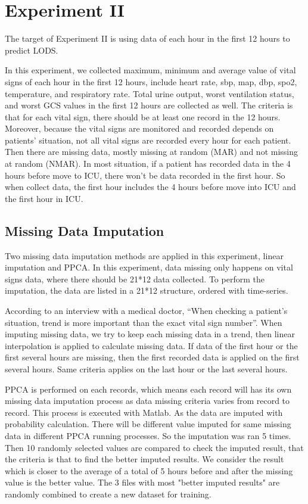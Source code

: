 \documentclass[12pt,a4paper,english
]{tunithesis}
\begin{document}
\section{Experiment II}

The target of Experiment II is using data of each hour in the first 12 hours to predict LODS.

In this experiment, we collected maximum, minimum and average value of vital signs of each hour in the first 12 hours, include heart rate, sbp, map, dbp, spo2, temperature, and respiratory rate. Total urine output, worst ventilation status, and worst GCS values in the first 12 hours are collected as well. The criteria is that for each vital sign, there should be at least one record in the 12 hours. Moreover, because the vital signs are monitored and recorded depends on patients' situation, not all vital signs are recorded every hour for each patient. Then there are missing data, mostly missing at random (MAR) and not missing at random (NMAR). In most situation, if a patient has recorded data in the 4 hours before move to ICU, there won't be data recorded in the first hour. So when collect data, the first hour includes the 4 hours before move into ICU and the first hour in ICU.

\subsection{Missing Data Imputation}

Two missing data imputation methods are applied in this experiment, linear imputation and PPCA. In this experiment, data missing only happens on vital signs data, where there should be 21*12 data collected. To perform the imputation, the data are listed in a 21*12 structure, ordered with time-series.

According to an interview with a medical doctor, \enquote{When checking a patient's situation, trend is more important than the exact vital sign number}. When imputing missing data, we try to keep each missing data in a trend, then linear interpolation is applied to calculate missing data. If data of the first hour or the first several hours are missing, then the first recorded data is applied on the first several hours. Same criteria applies on the last hour or the last several hours.

PPCA is performed on each records, which means each record will has its own missing data imputation process as data missing criteria varies from record to record. This process is executed with Matlab. As the data are imputed with probability calculation. There will be different value imputed for same missing data in different PPCA running processes. So the imputation was ran 5 times. Then 10 randomly selected values are compared to check the imputed result, that the criteria is that to find the better imputed results. We consider the result which is closer to the average of a total of 5 hours before and after the missing value is the better value. The 3 files with most "better imputed results" are randomly combined to create a new dataset for training.
\end{document}
